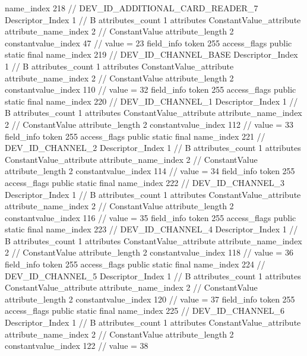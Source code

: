 {{{{{				name_index	218		// DEV_ID_ADDITIONAL_CARD_READER_7
				Descriptor_Index	1		// B
				attributes_count	1
				attributes {
				ConstantValue_attribute {
					attribute_name_index	2		// ConstantValue
					attribute_length	2
					constantvalue_index	47		// value = 23
				}
				}
			}
			field_info {
				token	255
				access_flags	public static final
				name_index	219		// DEV_ID_CHANNEL_BASE
				Descriptor_Index	1		// B
				attributes_count	1
				attributes {
				ConstantValue_attribute {
					attribute_name_index	2		// ConstantValue
					attribute_length	2
					constantvalue_index	110		// value = 32
				}
				}
			}
			field_info {
				token	255
				access_flags	public static final
				name_index	220		// DEV_ID_CHANNEL_1
				Descriptor_Index	1		// B
				attributes_count	1
				attributes {
				ConstantValue_attribute {
					attribute_name_index	2		// ConstantValue
					attribute_length	2
					constantvalue_index	112		// value = 33
				}
				}
			}
			field_info {
				token	255
				access_flags	public static final
				name_index	221		// DEV_ID_CHANNEL_2
				Descriptor_Index	1		// B
				attributes_count	1
				attributes {
				ConstantValue_attribute {
					attribute_name_index	2		// ConstantValue
					attribute_length	2
					constantvalue_index	114		// value = 34
				}
				}
			}
			field_info {
				token	255
				access_flags	public static final
				name_index	222		// DEV_ID_CHANNEL_3
				Descriptor_Index	1		// B
				attributes_count	1
				attributes {
				ConstantValue_attribute {
					attribute_name_index	2		// ConstantValue
					attribute_length	2
					constantvalue_index	116		// value = 35
				}
				}
			}
			field_info {
				token	255
				access_flags	public static final
				name_index	223		// DEV_ID_CHANNEL_4
				Descriptor_Index	1		// B
				attributes_count	1
				attributes {
				ConstantValue_attribute {
					attribute_name_index	2		// ConstantValue
					attribute_length	2
					constantvalue_index	118		// value = 36
				}
				}
			}
			field_info {
				token	255
				access_flags	public static final
				name_index	224		// DEV_ID_CHANNEL_5
				Descriptor_Index	1		// B
				attributes_count	1
				attributes {
				ConstantValue_attribute {
					attribute_name_index	2		// ConstantValue
					attribute_length	2
					constantvalue_index	120		// value = 37
				}
				}
			}
			field_info {
				token	255
				access_flags	public static final
				name_index	225		// DEV_ID_CHANNEL_6
				Descriptor_Index	1		// B
				attributes_count	1
				attributes {
				ConstantValue_attribute {
					attribute_name_index	2		// ConstantValue
					attribute_length	2
					constantvalue_index	122		// value = 38
}}}}}}}
